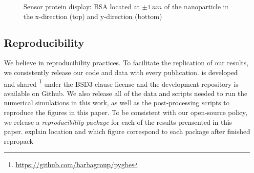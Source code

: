 \begin{figure*}[]

   \centering
    \vfill
    \caption{Sensor protein display: BSA located at $\pm 1 \, nm$ of the nanoparticle in the
            x-direction (top) and y-direction (bottom)}
    \label{fig:display_xy}
\end{figure*}

\subsection{Reproducibility} \label{sec:repro}

We believe in reproducibility practices. To facilitate the replication of our results, 
we consistently release our code and data with every publication. \pygbe is developed and 
shared \footnote{\url{https://github.com/barbagroup/pygbe}} under the BSD3-clause 
license and the development repository is available on Github. We also release
all of the data and scripts needed to run the numerical simulations in this work, 
as well as the post-processing scripts to reproduce the figures in this paper. To be consistent with our open-source policy, we release a \textit{reproducibility package} for each of the results prensented in
this paper. {\color{red} explain location and which figure correspond to each package
after finished repropack}


